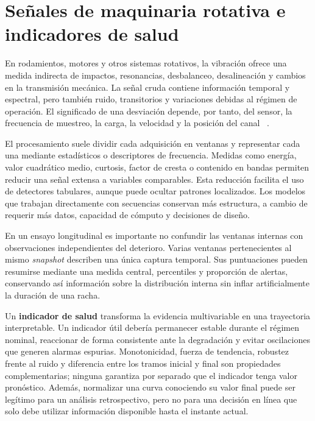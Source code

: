 \section{Señales de maquinaria rotativa e indicadores de salud}

En rodamientos, motores y otros sistemas rotativos, la vibración ofrece una
medida indirecta de impactos, resonancias, desbalanceo, desalineación y cambios
en la transmisión mecánica. La señal cruda contiene información temporal y
espectral, pero también ruido, transitorios y variaciones debidas al régimen de
operación. El significado de una desviación depende, por tanto, del sensor, la
frecuencia de muestreo, la carga, la velocidad y la posición del canal
~\cite{qiu2006_bearing_prognostics,lei2018_machinery_prognostics}.

El procesamiento suele dividir cada adquisición en ventanas y representar cada
una mediante estadísticos o descriptores de frecuencia. Medidas como energía,
valor cuadrático medio, curtosis, factor de cresta o contenido en bandas permiten
reducir una señal extensa a variables comparables. Esta reducción facilita el
uso de detectores tabulares, aunque puede ocultar patrones localizados. Los
modelos que trabajan directamente con secuencias conservan más estructura, a
cambio de requerir más datos, capacidad de cómputo y decisiones de diseño.

En un ensayo longitudinal es importante no confundir las ventanas internas con
observaciones independientes del deterioro. Varias ventanas pertenecientes al
mismo \textit{snapshot} describen una única captura temporal. Sus puntuaciones
pueden resumirse mediante una medida central, percentiles y proporción de
alertas, conservando así información sobre la distribución interna sin inflar
artificialmente la duración de una racha.

Un \textbf{indicador de salud} transforma la evidencia multivariable en una
trayectoria interpretable. Un indicador útil debería permanecer estable durante
el régimen nominal, reaccionar de forma consistente ante la degradación y evitar
oscilaciones que generen alarmas espurias. Monotonicidad, fuerza de tendencia,
robustez frente al ruido y diferencia entre los tramos inicial y final son
propiedades complementarias; ninguna garantiza por separado que el indicador
tenga valor pronóstico. Además, normalizar una curva conociendo su valor final
puede ser legítimo para un análisis retrospectivo, pero no para una decisión en
línea que solo debe utilizar información disponible hasta el instante actual.

